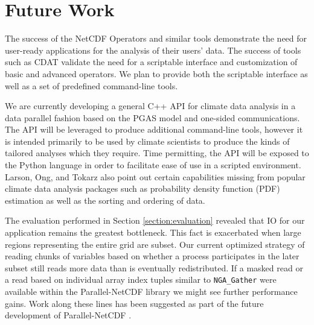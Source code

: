 \section{Future Work}
\label{section:future}

The success of the NetCDF Operators\cite{NCO} and similar tools demonstrate
the need for user-ready applications for the analysis of their users' data.
The success of tools such as CDAT\cite{CDAT} validate the need for a
scriptable interface and customization of basic and advanced operators.  We
plan to provide both the scriptable interface as well as a set of predefined
command-line tools.

We are currently developing a general C++ API for climate data analysis in a
data parallel fashion based on the PGAS model and one-sided communications.
The API will be leveraged to produce additional command-line tools, however it
is intended primarily to be used by climate scientists to produce the kinds of
tailored analyses which they require.  Time permitting, the API will be
exposed to the Python language in order to facilitate ease of use in a
scripted environment.  Larson, Ong, and Tokarz also point out certain
capabilities missing from popular climate data analysis packages such as
probability density function (PDF) estimation as well as the sorting and
ordering of data.

The evaluation performed in Section \ref{section:evaluation} revealed that IO
for our application remains the greatest bottleneck.  This fact is exacerbated
when large regions representing the entire grid are subset.  Our current
optimized strategy of reading chunks of variables based on whether a process
participates in the later subset still reads more data than is eventually
redistributed.  If a masked read or a read based on individual array index
tuples similar to \verb+NGA_Gather+ were available within the Parallel-NetCDF
library we might see further performance gains.  Work along these lines has
been suggested as part of the future development of Parallel-NetCDF
\cite{PNETCDFOPT}.
